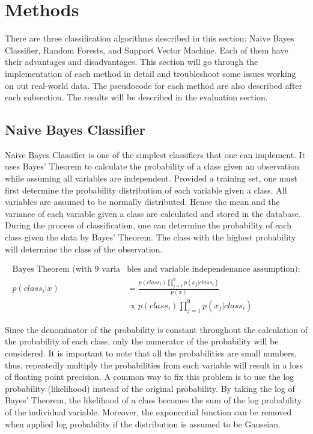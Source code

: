 \documentclass[twoside]{article}
\begin{document}

\section{Methods}
There are three classification algorithms described in this section: Naive Bayes Classifier, Random Forests, and Support Vector Machine. Each of them have their advantages and disadvantages. This section will go through the implementation of each method in detail and troubleshoot some issues working on out real-world data. The pseudocode for each method are also described after each subsection. The results will be described in the evaluation section.

\subsection{Naive Bayes Classifier}
Naive Bayes Classifier is one of the simplest classifiers that one can implement. It uses Bayes' Theorem to calculate the probability of a class given an observation while assuming all variables are independent. Provided a training set, one must first determine the probability distribution of each variable given a class. All variables are assumed to be normally distributed. Hence the mean and the variance of each variable given a class are calculated and stored in the database. During the process of classification, one can determine the probability of each class given the data by Bayes' Theorem. The class with the highest probability will determine the class of the observation.

\begin{align*}
\text{Bayes Theorem (with 9 varia}&\text{bles and variable independenance assumption):}\\
p(class_i | x) &= \frac{p(class_i) \prod\limits_{j=1}^{9}  p(x_j|class_i)}{p(x)}\\
&\propto p(class_i) \prod\limits_{j=1}^{9}  p(x_j|class_i)
\end{align*}

Since the denominator of the probability is constant throughout the calculation of the probability of each class, only the numerator of the probability will be considered. It is important to note that all the probabilities are small numbers, thus, repeatedly multiply the probabilities from each variable will result in a loss of floating point precision. A common way to fix this problem is to use the log probability (likelihood) instead of the original probability. By taking the log of Bayes' Theorem, the likelihood of a class becomes the sum of the log probability of the individual variable. Moreover, the exponential function can be removed when applied log probability if the distribution is assumed to be Gaussian.
\end{document}
